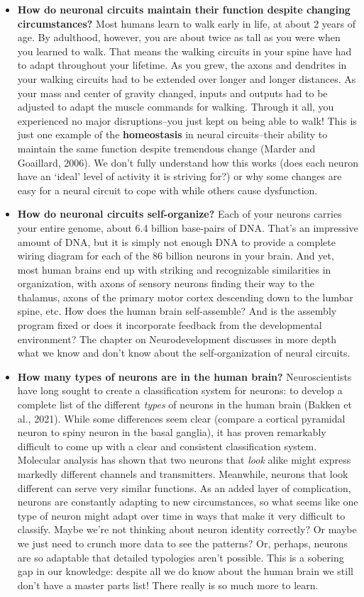 \documentclass[
]{book}
\providecommand{\tightlist}{%
  \setlength{\itemsep}{0pt}\setlength{\parskip}{0pt}}
\begin{document}
\begin{itemize}
\tightlist
\item
  \textbf{How do neuronal circuits maintain their function despite changing circumstances? } Most humans learn to walk early in life, at about 2 years of age. By adulthood, however, you are about twice as tall as you were when you learned to walk. That means the walking circuits in your spine have had to adapt throughout your lifetime. As you grew, the axons and dendrites in your walking circuits had to be extended over longer and longer distances. As your mass and center of gravity changed, inputs and outputs had to be adjusted to adapt the muscle commands for walking. Through it all, you experienced no major disruptions--you just kept on being able to walk! This is just one example of the \textbf{homeostasis }in neural circuits--their ability to maintain the same function despite tremendous change (Marder and Goaillard, 2006). We don't fully understand how this works (does each neuron have an `ideal' level of activity it is striving for?) or why some changes are easy for a neural circuit to cope with while others cause dysfunction.\\
\item
  \textbf{How do neuronal circuits self-organize? }Each of your neurons carries your entire genome, about 6.4 billion base-pairs of DNA. That's an impressive amount of DNA, but it is simply not enough DNA to provide a complete wiring diagram for each of the 86 billion neurons in your brain. And yet, most human brains end up with striking and recognizable similarities in organization, with axons of sensory neurons finding their way to the thalamus, axons of the primary motor cortex descending down to the lumbar spine, etc. How does the human brain self-assemble? And is the assembly program fixed or does it incorporate feedback from the developmental environment? The chapter on Neurodevelopment discusses in more depth what we know and don't know about the self-organization of neural circuits.
\item
  \textbf{How many types of neurons are in the human brain? }Neuroscientists have long sought to create a classification system for neurons: to develop a complete list of the different \emph{types} of neurons in the human brain (Bakken et al., 2021). While some differences seem clear (compare a cortical pyramidal neuron to spiny neuron in the basal ganglia), it has proven remarkably difficult to come up with a clear and consistent classification system. Molecular analysis has shown that two neurons that \emph{look} alike might express markedly different channels and transmitters. Meanwhile, neurons that look different can serve very similar functions. As an added layer of complication, neurons are constantly adapting to new circumstances, so what seems like one type of neuron might adapt over time in ways that make it very difficult to classify. Maybe we're not thinking about neuron identity correctly? Or maybe we just need to crunch more data to see the patterns? Or, perhaps, neurons are so adaptable that detailed typologies aren't possible. This is a sobering gap in our knowledge: despite all we do know about the human brain we still don't have a master parts list! There really is so much more to learn.

\end{itemize}
\end{document}
